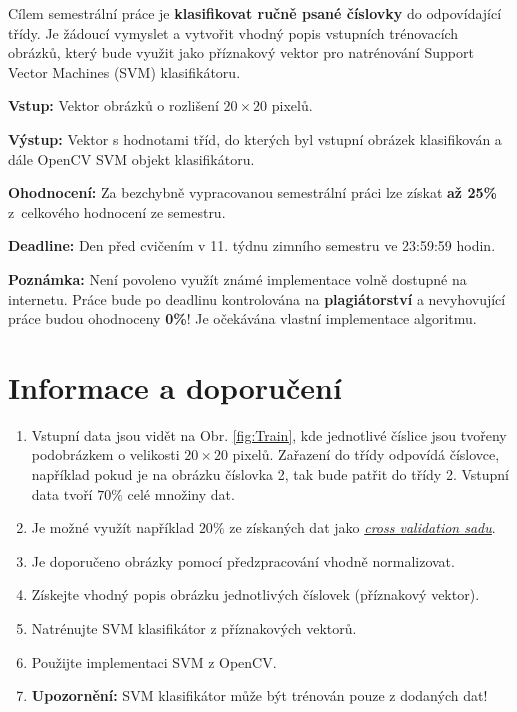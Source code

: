 \documentclass[12pt, a4paper]{article}
\begin{document}
\par{Cílem semestrální práce je \textbf{klasifikovat ručně psané číslovky} do odpovídající třídy. Je žádoucí vymyslet a vytvořit vhodný popis vstupních trénovacích obrázků, který bude využit jako příznakový vektor pro natrénování Support Vector Machines (SVM) klasifikátoru.}

\par{\textbf{Vstup:} Vektor obrázků o rozlišení $20 \times 20$ pixelů.}

\par{\textbf{Výstup:} Vektor s hodnotami tříd, do kterých byl vstupní obrázek klasifikován a dále OpenCV SVM objekt klasifikátoru.}

\par{\textbf{Ohodnocení:} Za bezchybně vypracovanou semestrální práci lze získat \textbf{až 25\%} z~celkového hodnocení ze semestru.}

\par{\textbf{Deadline:} Den před cvičením v 11. týdnu zimního semestru ve 23:59:59 hodin.}

\par{\textbf{Poznámka:} Není povoleno využít známé implementace volně dostupné na internetu. Práce bude po deadlinu kontrolována na \textbf{plagiátorství} a nevyhovující práce budou ohodnoceny \textbf{0\%}! Je očekávána vlastní implementace algoritmu.}

\section*{Informace a doporučení}
\begin{enumerate}
	\item Vstupní data jsou vidět na Obr. \ref{fig:Train}, kde jednotlivé číslice jsou tvořeny podobrázkem o velikosti $20 \times 20$ pixelů. Zařazení do třídy odpovídá číslovce, například pokud je na obrázku číslovka 2, tak bude patřit do třídy 2. Vstupní data tvoří $70\%$ celé množiny dat.
	\item Je možné využít například $20\%$ ze získaných dat jako \href{http://en.wikipedia.org/wiki/Cross-validation_(statistics)}{\textit{cross validation sadu}}. 
	\item Je doporučeno obrázky pomocí předzpracování vhodně normalizovat.
	\item Získejte vhodný popis obrázku jednotlivých číslovek (příznakový vektor).
	\item Natrénujte SVM klasifikátor z příznakových vektorů.
	\item Použijte implementaci SVM z OpenCV.
	\item \textbf{Upozornění:} SVM klasifikátor může být trénován pouze z dodaných dat!
\end{enumerate}
\end{document}

